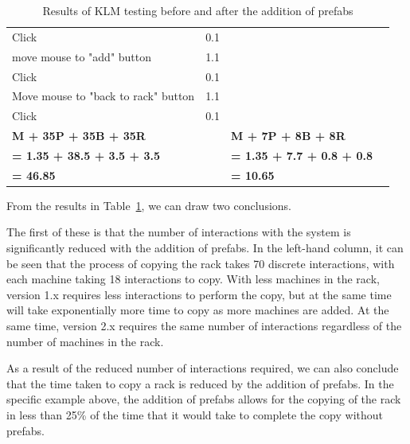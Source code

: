 \documentclass[11pt]{article}
\begin{document}
\begin{table}[]
{\begin{tabular}{llll}
					Click                                    & 0.1       &                                                 &     \\
					move mouse to "add" button               & 1.1       &                                                 &     \\
					Click                                    & 0.1       &                                                 &     \\
					Move mouse to "back to rack" button      & 1.1       &                                                 &     \\
					Click                                    & 0.1       &                                                 &     \\ \midrule
					\textbf{M + 35P + 35B + 35R}             &           & \textbf{M + 7P + 8B + 8R}                       &     \\
					\textbf{= 1.35 + 38.5 + 3.5 + 3.5}       & \textbf{} & \textbf{= 1.35 + 7.7 + 0.8 + 0.8}               &     \\
					\textbf{= 46.85}                         & \textbf{} & \textbf{= 10.65}                                &     \\ \bottomrule
				\end{tabular}%
				}
				\caption{Results of KLM testing before and after the addition of prefabs}
				\label{tab:results}
			\end{table}

			From the results in Table~\ref{tab:results}, we can draw two conclusions.

			The first of these is that the number of interactions with the system is significantly reduced with the addition of prefabs.
			In the left-hand column, it can be seen that the process of copying the rack takes 70 discrete interactions, with each machine taking 18 interactions to copy.
			With less machines in the rack, version 1.x requires less interactions to perform the copy, but at the same time will take exponentially more time to copy as more machines are added.
			At the same time, version 2.x requires the same number of interactions regardless of the number of machines in the rack.

			As a result of the reduced number of interactions required, we can also conclude that the time taken to copy a rack is reduced by the addition of prefabs.
			In the specific example above, the addition of prefabs allows for the copying of the rack in less than 25\% of the time that it would take to complete the copy without prefabs.
\end{document}
